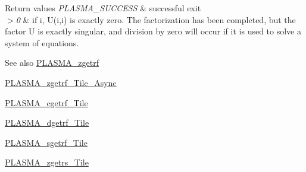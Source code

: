 \begin{DoxyRetVals}{Return values}
{\em P\+L\+A\+S\+M\+A\+\_\+\+S\+U\+C\+C\+E\+S\+S} & successful exit \\
\hline
{\em $>$0} & if i, U(i,i) is exactly zero. The factorization has been completed, but the factor U is exactly singular, and division by zero will occur if it is used to solve a system of equations.\\
\hline
\end{DoxyRetVals}
\begin{DoxySeeAlso}{See also}
\hyperlink{group__PLASMA__Complex64__t_ga03449aa4e83b2f2223dad281d122697d_ga03449aa4e83b2f2223dad281d122697d}{P\+L\+A\+S\+M\+A\+\_\+zgetrf} 

\hyperlink{group__PLASMA__Complex64__t__Tile__Async_ga8005f834cea1750e617b078d2cfa39d2_ga8005f834cea1750e617b078d2cfa39d2}{P\+L\+A\+S\+M\+A\+\_\+zgetrf\+\_\+\+Tile\+\_\+\+Async} 

\hyperlink{group__PLASMA__Complex32__t__Tile_ga6bbb7b97e2d8a2a501e87db53f285aff_ga6bbb7b97e2d8a2a501e87db53f285aff}{P\+L\+A\+S\+M\+A\+\_\+cgetrf\+\_\+\+Tile} 

\hyperlink{group__double__Tile_ga81f1d06f7d8cb682a15bf6c40c99924c_ga81f1d06f7d8cb682a15bf6c40c99924c}{P\+L\+A\+S\+M\+A\+\_\+dgetrf\+\_\+\+Tile} 

\hyperlink{group__float__Tile_ga1a6955304fcecceca1052439c28f3522_ga1a6955304fcecceca1052439c28f3522}{P\+L\+A\+S\+M\+A\+\_\+sgetrf\+\_\+\+Tile} 

\hyperlink{group__PLASMA__Complex64__t__Tile_ga143e5ed5a42b9fa3ae76b4df3258d071_ga143e5ed5a42b9fa3ae76b4df3258d071}{P\+L\+A\+S\+M\+A\+\_\+zgetrs\+\_\+\+Tile} 
\end{DoxySeeAlso}
\hypertarget{group__PLASMA__Complex64__t__Tile_ga541593661d073c73cc922d06ba49f700_ga541593661d073c73cc922d06ba49f700}{}

